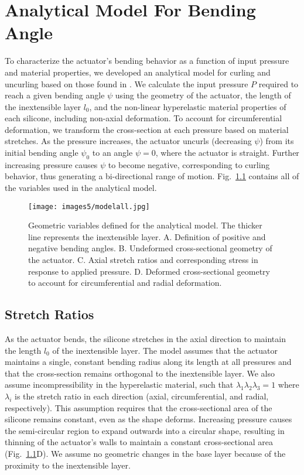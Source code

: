 \chapter{Analytical Model For Bending Angle}
\label{chapter:model}

To characterize the actuator's bending behavior as a function of input pressure and material properties, we developed an analytical model for curling and uncurling based on those found in \cite{polygerinos_modeling_2015, connolly_automatic_2017, hu_precurved_2022}. We calculate the input pressure $P$ required to reach a given bending angle $\psi$ using the geometry of the actuator, the length of the inextensible layer $l_0$, and the non-linear hyperelastic material properties of each silicone, including non-axial deformation. To account for circumferential deformation, we transform the cross-section at each pressure based on material stretches. As the pressure increases, the actuator uncurls (decreasing $\psi$) from its initial bending angle $\psi_0$ to an angle $\psi=0$, where the actuator is straight. Further increasing pressure causes $\psi$ to become negative, corresponding to curling behavior, thus generating a bi-directional range of motion. Fig.~\ref{fig:modelall} contains all of the variables used in the analytical model. 

\begin{figure}[ht]
    \centering
     \texttt{[image: images5/modelall.jpg]}
    \caption{Geometric variables defined for the analytical model. The thicker line represents the inextensible layer. A. Definition of positive and negative bending angles. B. Undeformed cross-sectional geometry of the actuator. C. Axial stretch ratios and corresponding stress in response to applied pressure. D. Deformed cross-sectional geometry to account for circumferential and radial deformation.}
    \label{fig:modelall}
\end{figure}

\clearpage
\section{Stretch Ratios}

As the actuator bends, the silicone stretches in the axial direction to maintain the length $l_0$ of the inextensible layer. The model assumes that the actuator maintains a single, constant bending radius along its length at all pressures and that the cross-section remains orthogonal to the inextensible layer. We also assume incompressibility in the hyperelastic material, such that $\lambda_{1}\lambda_{2}\lambda_{3} = 1$ where $\lambda_i$ is the stretch ratio in each direction (axial, circumferential, and radial, respectively). This assumption requires that the cross-sectional area of the silicone remains constant, even as the shape deforms. Increasing pressure causes the semi-circular region to expand outwards into a circular shape, resulting in thinning of the actuator's walls to maintain a constant cross-sectional area (Fig.~\ref{fig:modelall}D). We assume no geometric changes in the base layer because of the proximity to the inextensible layer.

